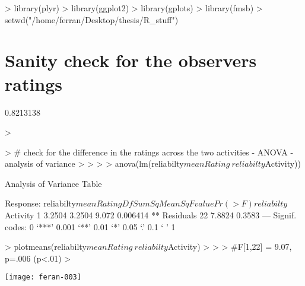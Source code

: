 \documentclass{article}
\begin{document}


\begin{Schunk}
\begin{Sinput}
> library(plyr)
> library(ggplot2)
> library(gplots)
> library(fmsb)
> setwd("/home/ferran/Desktop/thesis/R_stuff")
\end{Sinput}
\end{Schunk}


\section{Sanity check for the observers ratings}

\begin{Schunk}
\begin{Soutput}
[1] 0.8213138
\end{Soutput}
\begin{Sinput}
> 
\end{Sinput}
\end{Schunk}

\begin{Schunk}
\begin{Sinput}
> # check for the difference in the ratings across the two activities - ANOVA - analysis of variance
> 
> 
> 
> anova(lm(reliabilty$meanRating~reliabilty$Activity))
\end{Sinput}
\begin{Soutput}
Analysis of Variance Table

Response: reliabilty$meanRating
                    Df Sum Sq Mean Sq F value   Pr(>F)   
reliabilty$Activity  1 3.2504  3.2504   9.072 0.006414 **
Residuals           22 7.8824  0.3583                    
---
Signif. codes:  0 ‘***’ 0.001 ‘**’ 0.01 ‘*’ 0.05 ‘.’ 0.1 ‘ ’ 1
\end{Soutput}
\begin{Sinput}
> plotmeans(reliabilty$meanRating~reliabilty$Activity)
> 
> 
> #F[1,22] = 9.07, p=.006 (p<.01)
> 
\end{Sinput}
\end{Schunk}
\texttt{[image: feran-003]}
\end{document}
